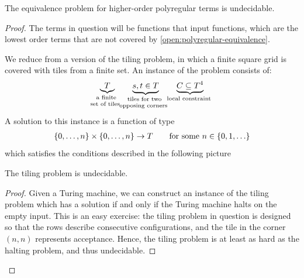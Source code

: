 \begin{theorem} \label{thm:undecidability-higher-order}
    The equivalence problem for higher-order polyregular terms is undecidable.
\end{theorem}
\begin{proof}
    The terms in question will be functions that input functions, which are the lowest order terms that are not covered by \cref{open:polyregular-equivalence}. 

    We reduce from a version of the tiling problem, in which a finite square grid is covered with tiles from a finite set. An instance of the problem consists of:
    \begin{align*}
    \myunderbrace{
        T
    }{
        a finite \\ set of tiles
    }
    \qquad 
    \myunderbrace{ 
        s,t \in T
    }{
        tiles for two \\ opposing corners
    }
    \qquad 
    \myunderbrace{ 
        C \subseteq T^4
    }{local constraint}
    \end{align*}
    A solution to this instance is a function of type 
    \begin{align*}
    \{0,\ldots,n\}\times \{0,\ldots,n\} \to T \qquad \text{for some $n \in \{0,1,\ldots\}$}
    \end{align*}
    which satisfies the conditions described in the following picture
    \begin{lemma}\label{lem:tiling}
        The tiling problem is undecidable.
    \end{lemma}
    \begin{proof}
        Given a Turing machine, we can construct an instance of the tiling problem which has a solution if and only if the Turing machine halts on the empty input. This is an easy exercise: the  tiling problem in question is designed so that the rows describe consecutive configurations, and the tile in the corner $(n,n)$ represents acceptance.  Hence, the tiling problem is at least as hard as the halting problem, and thus undecidable.
    \end{proof}


\end{proof}
